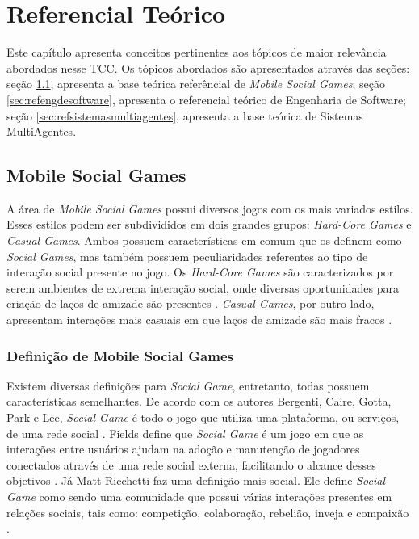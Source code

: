 \chapter[Referencial Teórico]{Referencial Teórico}

Este capítulo apresenta conceitos pertinentes aos tópicos de maior relevância
abordados nesse TCC. Os tópicos abordados são apresentados através das seções:
seção \ref{sec:refmobilesocialgames}, apresenta a base teórica referêncial
de \textit{Mobile Social Games}; seção \ref{sec:refengdesoftware},
apresenta o referencial teórico de Engenharia de Software; seção
\ref{sec:refsistemasmultiagentes}, apresenta a base teórica de
Sistemas MultiAgentes.

\section{Mobile Social Games}
\label{sec:refmobilesocialgames}

A área de \textit{Mobile Social Games} possui diversos jogos com os mais variados estilos.
Esses estilos podem ser subdivididos em dois grandes grupos: \textit{Hard-Core Games} e \textit{Casual Games}. Ambos possuem características em comum que os definem como \textit{Social Games}, mas também possuem peculiaridades referentes ao tipo de interação social presente no jogo. Os \textit{Hard-Core Games} são caracterizados por serem ambientes de extrema interação social, onde diversas oportunidades para criação de laços de amizade são presentes \cite{cole2007}. \textit{Casual Games}, por outro lado, apresentam interações mais casuais em que laços de amizade são mais fracos \cite{ricchetti2015}.

    \subsection{Definição de Mobile Social Games}
Existem diversas definições para \textit{Social Game}, entretanto, todas possuem características semelhantes. De acordo com os autores Bergenti, Caire, Gotta, Park e Lee, \textit{Social Game} é todo o jogo que utiliza uma plataforma, ou serviços, de uma rede social \cite{bergenti2013} \cite{park2012}. Fields define que \textit{Social Game} é um jogo em que as interações entre usuários ajudam na adoção e manutenção de jogadores conectados através de uma rede social externa, facilitando o alcance desses objetivos \cite{fields2014}. Já Matt Ricchetti faz uma definição mais social. Ele define \textit{Social Game} como sendo uma comunidade que possui várias interações presentes em relações sociais, tais como: competição, colaboração, rebelião, inveja e compaixão \cite{ricchetti2015}.

